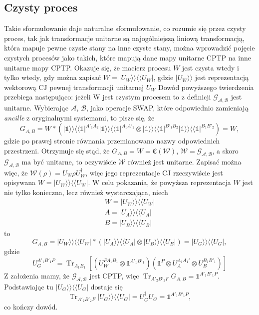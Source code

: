 \documentclass[10pt]{article} %
\DeclareMathOperator{\Trs}{Tr}
\newcommand{\BBra}[1]{\langle\langle#1|}
\newcommand{\KKet}[1]{|#1\rangle\rangle}
\newcommand{\I}{\mathbb{1}}
\newcommand{\MCJ}{\mathfrak{C}}
\begin{document}
\subsection{Czysty proces}
Takie sformułowanie daje naturalne sformułowanie, co rozumie się przez czysty proces, tak jak transformacje unitarne są najogólniejszą liniową transformacją, która mapuje pewne czyste stany na inne czyste stany, można wprowadzić pojęcie czystych procesów jako takich, które mapują dane mapy unitarne CPTP na inne unitarne mapy CPTP. 
Okazuje się, że macierz procesu $W$ jest czysta wtedy i tylko wtedy, gdy można zapisać $W = \KKet{U_W} \BBra{U_W}$, gdzie $\KKet{U_W}$ jest reprezentacją wektorową CJ pewnej transformacji unitarnej $U_W$
Dowód powyższego twierdzenia przebiega następująco: jeżeli W jest czystym procesem to z definicji $\mathcal{G_{A,B}}$ jest unitarne. Wybierając $\mathcal{A}$, $\mathcal{B}$, jako operacje SWAP, które odpowiednio zamieniają \textit{ancille} z oryginalnymi systemami, to pisze się, że
\begin{equation}
G_{A,B} = W * \left( \KKet{\I}\BBra{\I}^{A'_1 A_2} \KKet{\I}\BBra{\I}^{A_1A'_2} \otimes \KKet{\I}\BBra{\I}^{B'_1 B_2} \KKet{\I}\BBra{\I}^{B_1B'_2}\right) = W,
\end{equation}
gdzie po prawej stronie równania przemianowano nazwy odpowiednich przestrzeni. Otrzymuje się stąd, że $G_{A,B} = W = \MCJ (\mathcal{W})$, $\mathcal{W} = \mathcal{G_{A,B}}$, a skoro $\mathcal{G_{A,B}}$ ma być unitarne, to oczywiście $\mathcal{W}$ również jest unitarne.
Zapisać można więc, że $\mathcal{W}(\rho) = U_W\rho U_W^\dag$, więc jego reprezentacje CJ rzeczywiście jest opisywana $W = \KKet{U_W}\BBra{U_W}$. W celu pokazania, że powyższa reprezentacja $W$ jest nie tylko konieczna, lecz również wystarczająca, niech
\begin{gather}
W = \KKet{U_W}\BBra{U_W} \\
A = \KKet{U_A}\BBra{U_A} \\
B = \KKet{U_B}\BBra{U_B}
\end{gather}
to
\begin{equation}
G_{A,B} = \KKet{U_W}\BBra{U_W} * \left( \KKet{U_A}\BBra{U_A} \otimes \KKet{U_B}\BBra{U_B} \right) = \KKet{U_G}\BBra{U_G},
\end{equation} gdzie 
\begin{equation}
U_G^{A'_1B'_1P} = \Trs_{A_1B_1} \left[ \left( U_W^{PA_1B_1} \otimes \I^{A'_1B'_1}\right) \left( \I^P \otimes U_A^{A_1A_1'} \otimes U_B^{B_1B'_1}\right)\right]
\end{equation}
Z założenia mamy, że $\mathcal{G_{A,B}}$ jest CPTP, więc $\Trs_{A'_2B'_2F} G_{A,B} = \I^{A'_1B'_1P}$. Podstawiając tu $\KKet{U_G}\BBra{U_G}$ dostaje się
\begin{equation}
\Trs_{A'_2B'_2F} \KKet{U_G}\BBra{U_G} = U^\dag_G U_G = \I^{A'_1B'_1P},
\end{equation}
co kończy dowód.
\end{document}
